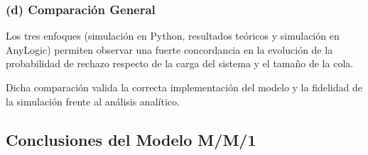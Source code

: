 \documentclass[12pt]{article}
\begin{document}
\subsubsection*{(d) Comparación General}

Los tres enfoques (simulación en Python, resultados teóricos y simulación en AnyLogic) permiten observar una fuerte concordancia en la evolución de la probabilidad de rechazo respecto de la carga del sistema y el tamaño de la cola.

Dicha comparación valida la correcta implementación del modelo y la fidelidad de la simulación frente al análisis analítico.





\subsection{Conclusiones del Modelo M/M/1}
\end{document}
